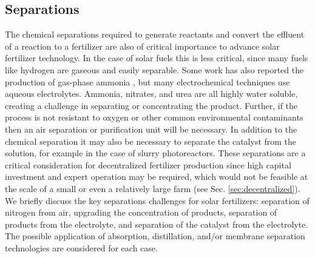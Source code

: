 \subsection{Separations}
\label{sec:separation}

The chemical separations required to generate reactants and convert the effluent of a reaction to a fertilizer are also of critical importance to advance solar fertilizer technology. In the case of solar fuels this is less critical, since many fuels like hydrogen are gaseous and easily separable. Some work has also reported the production of gas-phase ammonia \cite{Furuya_1989,lan2013synthesis,Kyriakou_2017}, but many electrochemical techniques use aqueous electrolytes. Ammonia, nitrates, and urea are all highly water soluble, creating a challenge in separating or concentrating the product. %
Further, if the process is not resistant to oxygen or other common environmental contaminants then an air separation or purification unit will be necessary. In addition to the chemical separation it may also be necessary to separate the catalyst from the solution, for example in the case of slurry photoreactors. These separations are a critical consideration for decentralized fertilizer production since high capital investment and expert operation may be required, which would not be feasible at the scale of a small or even a relatively large farm (see Sec. \ref{sec:decentralized}). We briefly discuss the key separations challenges for solar fertilizers: separation of nitrogen from air, upgrading the concentration of products, separation of products from the electrolyte, and separation of the catalyst from the electrolyte. The possible application of absorption, distillation, and/or membrane separation technologies are considered for each case.

